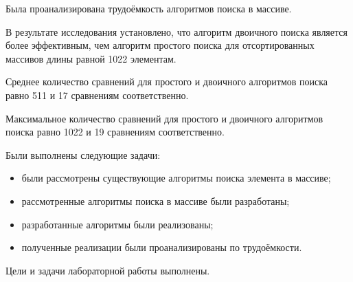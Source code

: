
Была проанализирована трудоёмкость алгоритмов поиска в массиве.

В результате исследования установлено, что алгоритм двоичного поиска является более эффективным, чем алгоритм простого поиска для отсортированных массивов длины равной 1022 элементам.

Среднее количество сравнений для простого и двоичного алгоритмов поиска равно 511 и 17 сравнениям соответственно. 

Максимальное количество сравнений для простого и двоичного алгоритмов поиска равно 1022 и 19 сравнениям соответственно.

Были выполнены следующие задачи:
\begin{itemize}
  \item были рассмотрены существующие алгоритмы поиска элемента в массиве;
  \item рассмотренные алгоритмы поиска в массиве были разработаны;
  \item разработанные алгоритмы были реализованы;
  \item полученные реализации были проанализированы по трудоёмкости.
\end{itemize}

Цели и задачи лабораторной работы выполнены.
